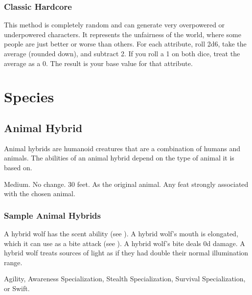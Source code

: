         \subsubsection{Classic Hardcore}

            This method is completely random and can generate very overpowered or underpowered characters.
            It represents the unfairness of the world, where some people are just better or worse than others.
            For each attribute, roll 2d6, take the average (rounded down), and subtract 2.
            If you roll a 1 on both dice, treat the average as a 0.
            The result is your base value for that attribute.

\newpage

\section{Species}

    \subsection{Animal Hybrid}
        Animal hybrids are humanoid creatures that are a combination of humans and animals.
        The abilities of an animal hybrid depend on the type of animal it is based on.

         Medium.
         No change.
         30 feet.
         As the original animal.
         Any feat strongly associated with the chosen animal.

        \subsubsection{Sample Animal Hybrids}


            \begin{itemize}
                 A hybrid wolf has the scent ability (see ).
                 A hybrid wolf's mouth is elongated, which it can use as a bite attack (see ).
                    A hybrid wolf's bite deals \plus0d damage.
                 A hybrid wolf treats sources of light as if they had double their normal illumination range.
            \end{itemize}
         Agility, Awareness Specialization, Stealth Specialization, Survival Specialization, or Swift.

